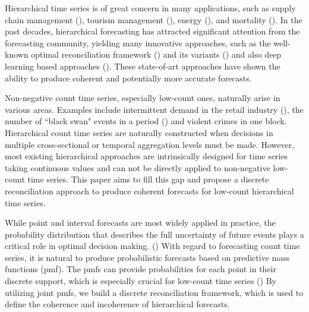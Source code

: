 \documentclass[a4paper,review,12pt,authoryear]{elsarticle}
\begin{document}
Hierarchical time series is of great concern in many applications, such as supply chain management (\citealp{babaiDemandForecastingSupply2022}), tourism management (\citealp{kourentzesCrosstemporalCoherentForecasts2019}), energy (\citealp{nystrupTemporalHierarchiesAutocorrelation2020}), and mortality (\citealp{liHierarchicalMortalityForecasting2022}).
In the past decades, hierarchical forecasting has attracted significant attention from the forecasting community, yielding many innovative approaches, such as the well-known optimal reconciliation framework (\citealp{hyndmanOptimalCombinationForecasts2011, wickramasuriyaOptimalForecastReconciliation2019, panagiotelisProbabilisticForecastReconciliation2022}) and its variants () and also deep learning based approaches (\citealp{rangapuramEndtoEndLearningCoherent2021}).
These state-of-art approaches have shown the ability to produce coherent and potentially more accurate forecasts.

Non-negative count time series, especially low-count ones, naturally arise in various areas. 
Examples include intermittent demand in the retail industry (\citealp{kourentzesElucidateStructureIntermittent2021}), the number of ``black swan" events in a period (\citealp{nikolopoulosWeNeedTalk2020}) and violent crimes in one block.
Hierarchical count time series are naturally constructed when decisions in multiple cross-sectional or temporal aggregation levels must be made.
However, most existing hierarchical approaches are intrinsically designed for time series taking continuous values and can not be directly applied to non-negative low-count time series. 
This paper aims to fill this gap and propose a discrete reconciliation approach to produce coherent forecasts for low-count hierarchical time series.

While point and interval forecasts are most widely applied in practice, 
the probability distribution that describes the full uncertainty of future events plays a critical role in optimal decision making. (\citealp{gneitingProbabilisticForecasting2014}) 
With regard to forecasting count time series, it is natural to produce probabilistic forecasts based on predictive mass functions (pmf). 
The pmfs can provide probabilities for each point in their discrete support,
which is especially crucial for low-count time series (\citealp{petropoulosForecastingTheoryPractice2022a})
By utilizing joint pmfs, we build a discrete reconciliation framework, which is used to define the coherence and incoherence of hierarchical forecasts.
\end{document}
